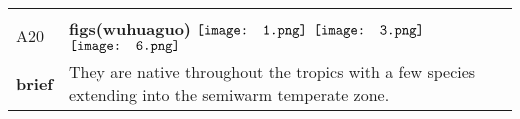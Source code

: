 \documentclass[UTF8]{article}
\begin{document}
            \begin{tabularx}{\textwidth}{p{1.5cm}X}
            \arrayrulecolor{myBlue}
        	\hline\\
            \small{A20}&
            \large{\bfseries{figs(wuhuaguo)}}\hfill
                                                            $\vcenter{\hbox{\texttt{[image: 1.png]}}}$
                                                                \phantom{$\vcenter{\hbox{\texttt{[image: 2.png]}}}$}
                                                                $\vcenter{\hbox{\texttt{[image: 3.png]}}}$
                                                                \phantom{$\vcenter{\hbox{\texttt{[image: 4.png]}}}$}
                                                                \phantom{$\vcenter{\hbox{\texttt{[image: 5.png]}}}$}
                                                                $\vcenter{\hbox{\texttt{[image: 6.png]}}}$
                                                                \phantom{$\vcenter{\hbox{\texttt{[image: 7.png]}}}$}
                                        \\[10pt]
            \large{\bfseries{brief}}&\noindent\parbox[c]{\hsize}{They are native throughout the tropics with a few species extending into the semiwarm temperate zone.} \\[5pt]
            \hline\\[-10pt]
        \end{tabularx}
\end{document}
